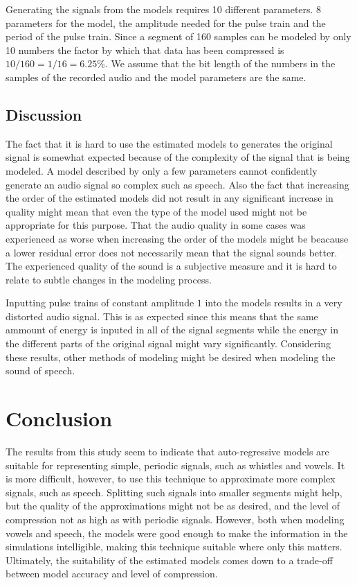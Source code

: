 \documentclass{IEEEtran}
\begin{document}
Generating the signals from the models requires 10 different parameters.
8 parameters for the model, the amplitude needed for the pulse train and
the period of the pulse train. Since a segment of 160 samples can be
modeled by only 10 numbers the factor by which that data has been
compressed is $10/160 = 1/16 = 6.25\%$. We assume that the bit length of
the numbers in the samples of the recorded audio and the model parameters
are the same.

\subsection{Discussion}
The fact that it is hard to use the estimated models to generates the
original signal is somewhat expected because of the complexity of the
signal that is being modeled. A model described by only a few parameters
cannot confidently generate an audio signal so complex such as speech.
Also the fact that increasing the order of the estimated models did not
result in any significant increase in quality might mean that even the
type of the model used might not be appropriate for this purpose. That
the audio quality in some cases was experienced as worse when increasing
the order of the models might be beacause a lower residual error does
not necessarily mean that the signal sounds better. The experienced
quality of the sound is a subjective measure and it is hard to relate
to subtle changes in the modeling process.

Inputting pulse trains of constant amplitude $1$ into the models results
in a very distorted audio signal. This is as expected since this means
that the same ammount of energy is inputed in all of the signal segments
while the energy in the different parts of the original signal might vary
significantly. Considering these results, other methods of modeling might
be desired when modeling the sound of speech.

\section{Conclusion}

The results from this study seem to indicate that auto-regressive models are
suitable for representing simple, periodic signals, such as whistles and
vowels. It is more difficult, however, to use this technique to approximate
more complex signals, such as speech. Splitting such signals into smaller
segments might help, but the quality of the approximations might not be as
desired, and the level of compression not as high as with periodic signals.
However, both when modeling vowels and speech, the models were good enough to
make the information in the simulations intelligible, making this technique
suitable where only this matters. Ultimately, the suitability of the estimated
models comes down to a trade-off between model accuracy and level of
compression.
\end{document}
